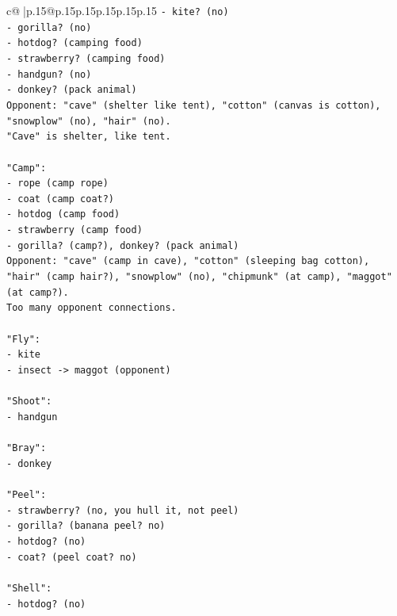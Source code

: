 \documentclass{article}
\begin{document}
{\begin{supertabular}{c@{$\;$}|p{.15\linewidth}@{}p{.15\linewidth}p{.15\linewidth}p{.15\linewidth}p{.15\linewidth}p{.15\linewidth}}
{{{\texttt{{-} kite? (no)} \\
\texttt{{-} gorilla? (no)} \\
\texttt{{-} hotdog? (camping food)} \\
\texttt{{-} strawberry? (camping food)} \\
\texttt{{-} handgun? (no)} \\
\texttt{{-} donkey? (pack animal)} \\
\texttt{Opponent: "cave" (shelter like tent), "cotton" (canvas is cotton), "snowplow" (no), "hair" (no).} \\
\texttt{"Cave" is shelter, like tent.} \\
\\ 
\texttt{"Camp":} \\
\texttt{{-} rope (camp rope)} \\
\texttt{{-} coat (camp coat?)} \\
\texttt{{-} hotdog (camp food)} \\
\texttt{{-} strawberry (camp food)} \\
\texttt{{-} gorilla? (camp?), donkey? (pack animal)} \\
\texttt{Opponent: "cave" (camp in cave), "cotton" (sleeping bag cotton), "hair" (camp hair?), "snowplow" (no), "chipmunk" (at camp), "maggot" (at camp?).} \\
\texttt{Too many opponent connections.} \\
\\ 
\texttt{"Fly":} \\
\texttt{{-} kite} \\
\texttt{{-} insect {-}> maggot (opponent)} \\
\\ 
\texttt{"Shoot":} \\
\texttt{{-} handgun} \\
\\ 
\texttt{"Bray":} \\
\texttt{{-} donkey} \\
\\ 
\texttt{"Peel":} \\
\texttt{{-} strawberry? (no, you hull it, not peel)} \\
\texttt{{-} gorilla? (banana peel? no)} \\
\texttt{{-} hotdog? (no)} \\
\texttt{{-} coat? (peel coat? no)} \\
\\ 
\texttt{"Shell":} \\
\texttt{{-} hotdog? (no)} \\
}}}
\end{supertabular}}
\end{document}
